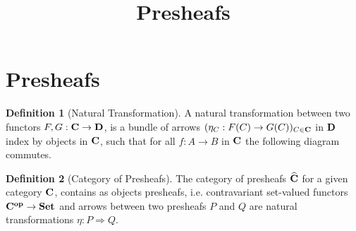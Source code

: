 \documentclass{scrartcl}
\title{Presheafs}
\date{}
\theoremstyle{definition}
\newtheorem{definition}{Definition}[section]
\begin{document}
\section{Presheafs}
\label{sec:presheafs}

\begin{definition}[Natural Transformation]
  A natural transformation between two functors $F,G: \mathbf{C} \rightarrow \mathbf{D}$, is a bundle of arrows $(\eta_C: F(C) \to G(C))_{C \in \mathbf{C}}$ in $\mathbf{D}$ index by objects in $\mathbf{C}$, such that for all $f:A \to B$ in $\mathbf{C}$ the following diagram commutes.
  \begin{center}
  \end{center}
\end{definition}

\begin{definition}[Category of Presheafs]
  The category of presheafs $\widehat{\mathbf{C}}$ for a given category $\mathbf{C}$, contains as objects presheafs, i.e. contravariant set-valued functors $\mathbf{C}^{\mathbf{op}} \rightarrow \mathbf{Set}$ and arrows between two presheafs $P$ and $Q$ are natural transformations $\eta: P \Rightarrow Q$.
\end{definition}
\end{document}

